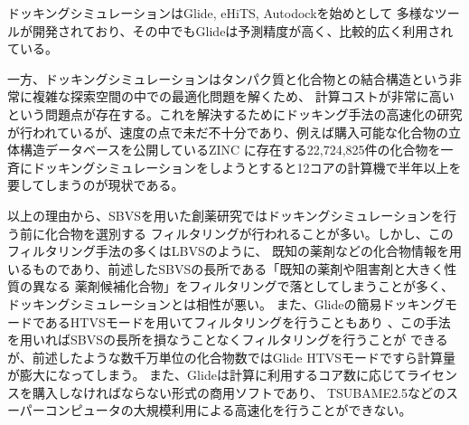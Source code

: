 ドッキングシミュレーションはGlide\cite{Friesner2004}, eHiTS\cite{Zsoldos2007}, Autodock\cite{Morris2009}を始めとして
多様なツールが開発されており、その中でもGlideは予測精度が高く\cite{Kruger2010}、比較的広く利用されている\cite{Yuriev2013}。

一方、ドッキングシミュレーションはタンパク質と化合物との結合構造という非常に複雑な探索空間の中での最適化問題を解くため、
計算コストが非常に高いという問題点が存在する。これを解決するためにドッキング手法の高速化の研究\cite{Kannan2010, McIntosh-Smith2014, Trott2010}
が行われているが、速度の点で未だ不十分であり、例えば購入可能な化合物の立体構造データベースを公開しているZINC
\cite{Irwin2005}に存在する22,724,825件の化合物を一斉にドッキングシミュレーションをしようとすると12コアの計算機で半年以上を要してしまうのが現状である。

%

以上の理由から、SBVSを用いた創薬研究ではドッキングシミュレーションを行う前に化合物を選別する
フィルタリングが行われることが多い\cite{Nilakantan1993, Parenti2003}。しかし、このフィルタリング手法の多くはLBVSのように、
既知の薬剤などの化合物情報を用いるものであり、前述したSBVSの長所である「既知の薬剤や阻害剤と大きく性質の異なる
薬剤候補化合物」をフィルタリングで落としてしまうことが多く、ドッキングシミュレーションとは相性が悪い。
また、Glideの簡易ドッキングモードであるHTVSモードを用いてフィルタリングを行うこともあり
\cite{Fujimoto2008}、この手法を用いればSBVSの長所を損なうことなくフィルタリングを行うことが
できるが、前述したような数千万単位の化合物数ではGlide HTVSモードですら計算量が膨大になってしまう。
また、Glideは計算に利用するコア数に応じてライセンスを購入しなければならない形式の商用ソフトであり、
TSUBAME2.5などのスーパーコンピュータの大規模利用による高速化を行うことができない。

